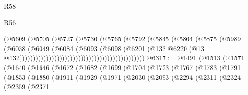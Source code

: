 \begin{lexlean}{R58}
\begin{lexlean}{R56}
\begin{coremodule}
{{{{{{{{{{{{{{{{{{{{{{{{{{{{{{{{{{{{{{{{{{{{{{{{{{{{{{{{{{{{{{{{{{{{{{{{{{{{{{{{{{{{{{{{{{{{{{{{{{{{{{{{{{{{{{{{{{{{{{{{{{{{{{{{{{{{{{{{{{{{{{{{{{{{{{{{{{{{{{{{{{{{{{{{{{{{{{{{{{{{{{{{{{{{{{{{{{{{{{{{{{{{{{{{{{{                                                              (@5609
                                                                (@5705
                                                                  (@5727
                                                                    (@5736
                                                                      (@5765
                                                                        (@5792
                                                                          (@5845
                                                                            (@5864
                                                                              (@5875
                                                                                (@5989
                                                                                  (@6038
                                                                                    (@6049
                                                                                      (@6084
                                                                                        (@6093
                                                                                          (@6098
                                                                                            (@6201
                                                                                              (@133
                                                                                                @6220
                                                                                                (@13
                                                                                                  @132)))))))))))))))))))))))))))))))))))))))))))))))
@6317 := @1491
    (@1513
      (@1571
        (@1640
          (@1646
            (@1672
              (@1682
                (@1699
                  (@1704
                    (@1723
                      (@1767
                        (@1783
                          (@1791
                            (@1853
                              (@1880
                                (@1911
                                  (@1929
                                    (@1971
                                      (@2030
                                        (@2093
                                          (@2294
                                            (@2311
                                              (@2324
                                                (@2359
                                                  (@2371
}}}}}}}}}}}}}}}}}}}}}}}}}}}}}}}}}}}}}}}}}}}}}}}}}}}}}}}}}}}}}}}}}}}}}}}}}}}}}}}}}}}}}}}}}}}}}}}}}}}}}}}}}}}}}}}}}}}}}}}}}}}}}}}}}}}}}}}}}}}}}}}}}}}}}}}}}}}}}}}}}}}}}}}}}}}}}}}}}}}}}}}}}}}}}}}}}}}}}}}}}}}}}}}}}}}
\end{coremodule}
\end{lexlean}
\end{lexlean}
